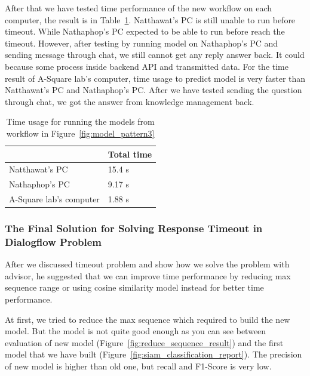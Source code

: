 \documentclass[12pt,oneside,openright,a4paper]{cpe-english-project}
\begin{document}
After that we have tested time performance of the new workflow on each computer,
the result is in Table~\ref*{tab:run_time_pattern3_table}.
Natthawat's PC is still unable to run before timeout.
While Nathaphop's PC expected to be able to run before reach the timeout.
However, after testing by running model on Nathaphop's PC and sending message through chat,
we still cannot get any reply answer back. It could because some process inside backend API and transmitted data.
For the time result of A-Square lab's computer, time usage to predict model is very faster than
Natthawat's PC and Nathaphop's PC.
After we have tested sending the question through chat, we got the answer from knowledge management back.

\begin{table}[h]
	\centering
	\caption{Time usage for running the models from workflow in Figure~\ref*{fig:model_pattern3}}
	\label{tab:run_time_pattern3_table}
	\begin{adjustbox}{width=\textwidth}
		\begin{tabular}{|l|l|}
			\hline
			\backslashbox{Computer name}{Time usage to predict each model} &Total time \\ \hline
			Natthawat's PC & 15.4 s \\ \hline
			Nathaphop's PC & 9.17 s \\ \hline
			A-Square lab's computer & 1.88 s \\ \hline
		\end{tabular}
	\end{adjustbox}
\end{table}

\pagebreak
\subsubsection{The Final Solution for Solving Response Timeout in Dialogflow Problem}
After we discussed timeout problem and show how we solve the problem with advisor,
he suggested that we can improve time performance by reducing max sequence range or using
cosine similarity model instead for better time performance.

At first, we tried to reduce the max sequence which required to build the new model.
But the model is not quite good enough as you can see between evaluation of new model
(Figure~\ref*{fig:reduce_sequence_result}) and the first model that we have built
(Figure~\ref*{fig:siam_classification_report}). The precision of new model is higher than old
one, but recall and F1-Score is very low.
\end{document}
